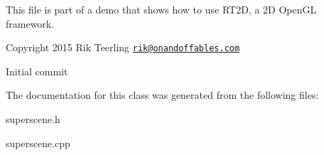 This file is part of a demo that shows how to use R\+T2D, a 2D Open\+GL framework.


\begin{DoxyItemize}
\item Copyright 2015 Rik Teerling \href{mailto:rik@onandoffables.com}{\tt rik@onandoffables.\+com}
\begin{DoxyItemize}
\item Initial commit 
\end{DoxyItemize}
\end{DoxyItemize}

The documentation for this class was generated from the following files\+:\begin{DoxyCompactItemize}
\item 
superscene.\+h\item 
superscene.\+cpp\end{DoxyCompactItemize}
